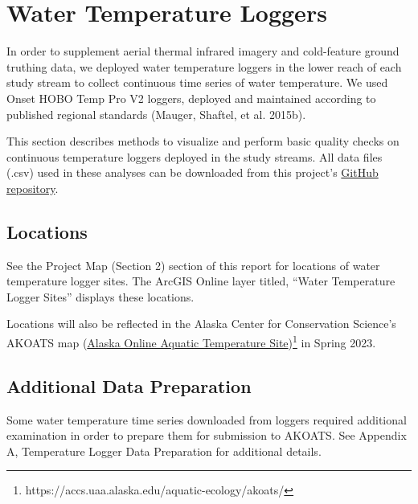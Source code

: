 \documentclass[
  letterpaper,
  DIV=11,
  numbers=noendperiod]{scrreprt}
\begin{document}

\hypertarget{water-temperature-loggers}{%
\chapter{Water Temperature Loggers}\label{water-temperature-loggers}}

In order to supplement aerial thermal infrared imagery and cold-feature
ground truthing data, we deployed water temperature loggers in the lower
reach of each study stream to collect continuous time series of water
temperature. We used Onset HOBO Temp Pro V2 loggers, deployed and
maintained according to published regional standards (Mauger, Shaftel,
et al. 2015b).

This section describes methods to visualize and perform basic quality
checks on continuous temperature loggers deployed in the study streams.
All data files (.csv) used in these analyses can be downloaded from this
project's
\href{https://github.com/Kenai-Watershed-Forum/kenai_thermal_imagery/tree/master/input}{GitHub
repository}.

\hypertarget{locations}{%
\section{Locations}\label{locations}}

See the Project Map (Section 2) section of this report for locations of
water temperature logger sites. The ArcGIS Online layer titled, ``Water
Temperature Logger Sites'' displays these locations.

Locations will also be reflected in the Alaska Center for Conservation
Science's AKOATS map
(\href{https://accs.uaa.alaska.edu/aquatic-ecology/akoats/}{Alaska
Online Aquatic Temperature Site})\footnote{https://accs.uaa.alaska.edu/aquatic-ecology/akoats/}
in Spring 2023.

\hypertarget{additional-data-preparation}{%
\section{Additional Data
Preparation}\label{additional-data-preparation}}

Some water temperature time series downloaded from loggers required
additional examination in order to prepare them for submission to
AKOATS. See Appendix A, Temperature Logger Data Preparation for
additional details.

\newpage
\end{document}
